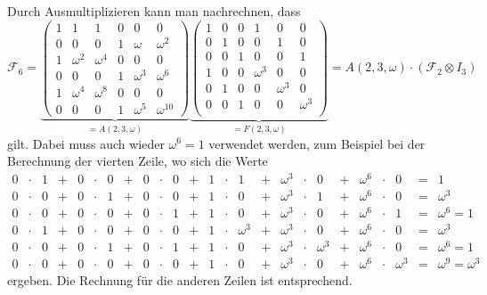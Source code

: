 Durch Ausmultiplizieren kann man nachrechnen, dass
\[
\mathscr{F}_6
=
\underbrace{
\left(\begin{array}{ccc|ccc}
1&       1&       1&      0&       0&          0\\
0&       0&       0&      1&\omega  &   \omega^2\\
\hline
1&\omega^2&\omega^4&      0&       0&          0\\
0&       0&       0&      1&\omega^3&   \omega^6\\
\hline
1&\omega^4&\omega^8&      0&       0&          0\\
0&       0&       0&      1&\omega^5&\omega^{10}
\end{array}\right)
}_{\displaystyle =A(2,3,\omega)}
\underbrace{
\left(\begin{array}{ccc|ccc}
1&0&0&       1&       0&       0\\
0&1&0&       0&       1&       0\\
0&0&1&       0&       0&       1\\
\hline
1&0&0&\omega^3&       0&       0\\
0&1&0&       0&\omega^3&       0\\
0&0&1&       0&       0&\omega^3\\
\end{array}\right)
}_{\displaystyle =F(2,3,\omega)}
=
A(2,3,\omega)
\cdot
(\mathscr{F}_2\otimes I_3)
\]
gilt.
Dabei muss auch wieder $\omega^6=1$ verwendet werden, zum Beispiel
bei der Berechnung der vierten Zeile, wo sich die Werte
\[
\renewcommand\arraycolsep{2pt}
\begin{array}{rclcrclcrclcrclcrclcrclcl}
0&\cdot&1 &+& 0&\cdot&0 &+& 0&\cdot&0 &+& 1&\cdot&1 &+& \omega^3&\cdot&0 &+& \omega^6&\cdot&0 &=& 1 \\
0&\cdot&0 &+& 0&\cdot&1 &+& 0&\cdot&0 &+& 1&\cdot&0 &+& \omega^3&\cdot&1 &+& \omega^6&\cdot&0 &=& \omega^3 \\
0&\cdot&0 &+& 0&\cdot&0 &+& 0&\cdot&1 &+& 1&\cdot&0 &+& \omega^3&\cdot&0 &+& \omega^6&\cdot&1 &=& \omega^6 = 1 \\
0&\cdot&1 &+& 0&\cdot&0 &+& 0&\cdot&0 &+& 1&\cdot&\omega^3 &+& \omega^3&\cdot&0 &+& \omega^6&\cdot&0 &=& \omega^3 \\
0&\cdot&0 &+& 0&\cdot&1 &+& 0&\cdot&1 &+& 1&\cdot&0 &+& \omega^3&\cdot&\omega^3 &+& \omega^6&\cdot&0 &=& \omega^6=1 \\
0&\cdot&0 &+& 0&\cdot&0 &+& 0&\cdot&0 &+& 1&\cdot&0 &+& \omega^3&\cdot&0 &+& \omega^6&\cdot&\omega^3 &=& \omega^9=\omega^3 
\end{array}
\]
ergeben.
Die Rechnung für die anderen Zeilen ist entsprechend.


